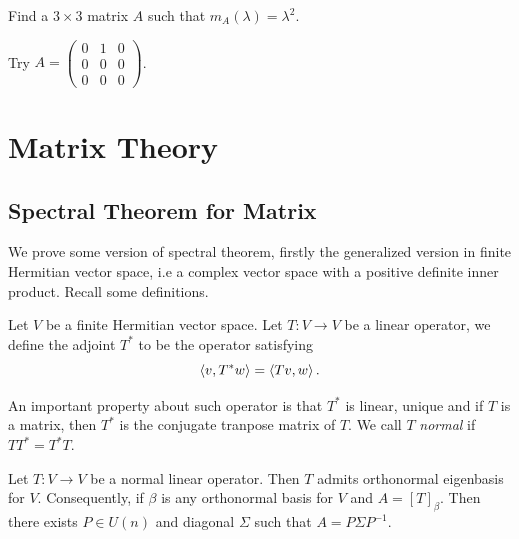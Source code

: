 ﻿\documentclass[12pt]{article}
\begin{document}
\begin{boxedproblem}
    Find a $3\times 3$ matrix $A$ such that $m_A(\lambda) = \lambda^2$.
\end{boxedproblem}
\begin{sol}
Try $A = \begin{pmatrix}
    0 & 1 & 0\\
    0 & 0 & 0\\
    0 & 0 & 0
\end{pmatrix}$.
\end{sol}
\section{Matrix Theory}
\subsection{Spectral Theorem for Matrix}
We prove some version of spectral theorem, firstly the generalized version in finite Hermitian vector space, i.e a complex vector space with a positive definite inner product. Recall some definitions.
\begin{definition}
    Let $V$ be a finite Hermitian vector space. Let $T: V \to V$ be a linear operator, we define the adjoint $T^*$ to be the operator satisfying 
    \[
        \left\langle v, T^*w  \right\rangle = \left\langle Tv,w \right\rangle.
    \]
\end{definition}
    An important property about such operator is that $T^*$ is linear, unique and if $T$ is a matrix, then $T^*$ is the conjugate tranpose matrix of $T$. We call $T$ \textit{normal} if $TT^* = T^*T$. 
\begin{theorem}
    Let $T: V \to V$ be a normal linear operator. Then $T$ admits orthonormal eigenbasis for $V$. 
    Consequently, if $\beta$ is any orthonormal basis for $V$ and $A = [T]_\beta$. Then there exists $P \in U(n)$ and diagonal $\Sigma$  such that $A = P \Sigma P^{-1}$.
\end{theorem}
\end{document}
